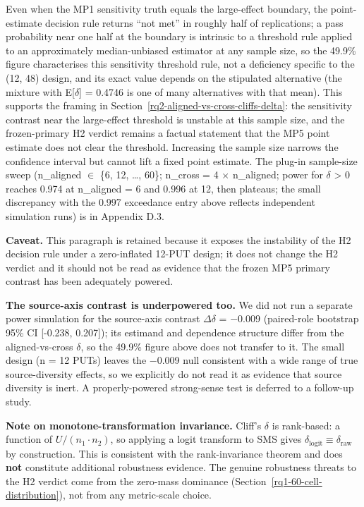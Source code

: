\documentclass[manuscript,screen,review]{acmart}
\begin{document}
Even when the MP1 sensitivity truth equals the large-effect boundary, the point-estimate
decision rule returns ``not met'' in roughly half of replications; a
pass probability near one half at the boundary is intrinsic to a
threshold rule applied to an approximately median-unbiased estimator
at any sample size, so the 49.9\% figure characterises this
sensitivity threshold rule, not a deficiency specific to the (12,
48) design, and its exact value depends on the stipulated alternative
(the mixture with E[$\delta$] = 0.4746 is one of many alternatives
with that mean). This supports the
framing in Section~\ref{rq2-aligned-vs-cross-cliffs-delta}: the sensitivity
contrast near the large-effect threshold is unstable at this sample size,
and the frozen-primary H2 verdict remains a factual statement that the
MP5 point estimate does not clear the threshold. Increasing the sample
size narrows the confidence interval but cannot lift a fixed point estimate. The plug-in
sample-size sweep (n\_aligned $\in$ \{6, 12, \ldots, 60\}; n\_cross = 4 $\times$
n\_aligned; power for $\delta$ \textgreater{} 0 reaches 0.974 at n\_aligned = 6
and 0.996 at 12, then plateaus; the small discrepancy with the 0.997
exceedance entry above reflects independent simulation runs) is in
Appendix D.3.

\textbf{Caveat.} This paragraph is retained because it exposes the
instability of the H2 decision rule under a zero-inflated 12-PUT design;
it does not change the H2 verdict and it should not be read as evidence
that the frozen MP5 primary contrast has been adequately powered.

\textbf{The source-axis contrast is underpowered too.} We did not run a
separate power simulation for the source-axis contrast $\Delta\delta$ =
$-$0.009 (paired-role bootstrap 95\% CI {[}-0.238, 0.207{]}); its estimand and dependence structure differ
from the aligned-vs-cross $\delta$, so the 49.9\% figure above does not
transfer to it. The small design (n = 12 PUTs) leaves the $-$0.009 null
consistent with a wide range of true source-diversity effects, so we
explicitly do not read it as evidence that source diversity is inert. A
properly-powered strong-sense test is deferred to a follow-up study.

\textbf{Note on monotone-transformation invariance.} Cliff's $\delta$ is
rank-based: a function of $U / (n_1 \cdot n_2)$, so applying a logit transform to
SMS gives $\delta_{\mathrm{logit}} \equiv \delta_{\mathrm{raw}}$ by construction. This is consistent with the
rank-invariance theorem and does \textbf{not} constitute additional
robustness evidence. The genuine robustness threats to the H2 verdict
come from the zero-mass dominance (Section~\ref{rq1-60-cell-distribution}), not from any metric-scale
choice.
\end{document}

